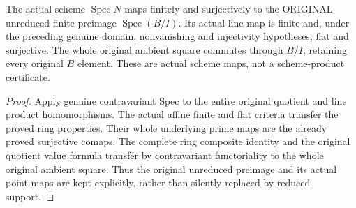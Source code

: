 \begin{theorem}
\label{scheme:whole-normalized-line-product}
\leanok
{}
The actual scheme $\operatorname{Spec}N$ maps finitely and surjectively
to the ORIGINAL unreduced finite preimage $\operatorname{Spec}(B/I)$.
Its actual line map is finite and, under the preceding genuine domain,
nonvanishing and injectivity hypotheses, flat and surjective. The whole
original ambient square commutes through $B/I$, retaining every original
$B$ element. These are actual scheme maps, not a scheme-product certificate.
\end{theorem}
\begin{proof}
Apply genuine contravariant Spec to the entire original quotient and
line product homomorphisms. The actual affine finite and flat criteria
transfer the proved ring properties. Their whole underlying prime
maps are the already proved surjective comaps. The complete ring
composite identity and the original quotient value formula transfer
by contravariant functoriality to the whole original ambient square.
Thus the original unreduced preimage and its actual point maps are
kept explicitly, rather than silently replaced by reduced support.
\end{proof}

